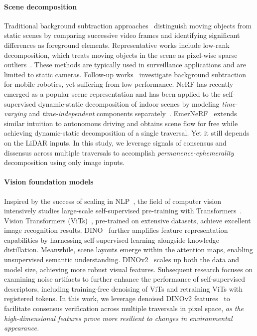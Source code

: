 \paragraph{Scene decomposition} Traditional background subtraction approaches~\cite{piccardi2004background,brutzer2011evaluation} distinguish moving objects from static scenes by comparing successive video frames and identifying significant differences as foreground elements. Representative works include low-rank decomposition, which treats moving objects in the scene as pixel-wise sparse outliers~\cite{zhou2012moving,liu2015background}. These methods are typically used in surveillance applications and are limited to static cameras. Follow-up works~\cite{hayman2003statistical,sheikh2009background} investigate background subtraction for mobile robotics, yet suffering from low performance. NeRF has recently emerged as a popular scene representation and has been applied to the self-supervised dynamic-static decomposition of indoor scenes by modeling \textit{time-varying} and \textit{time-independent} components separately~\cite{yuan2021star,wu2022d}. EmerNeRF~\cite{yang2023emernerf} extends similar intuition to autonomous driving and obtains scene flow for free while achieving dynamic-static decomposition of a single traversal. Yet it still depends on the LiDAR inputs. In this study, we leverage signals of consensus and dissensus across multiple traversals to accomplish \textit{permanence-ephemerality} decomposition using only image inputs.

\paragraph{Vision foundation models} Inspired by the success
of scaling in NLP~\cite{brown2020language}, the field of computer vision intensively studies large-scale self-supervised pre-training with Transformers~\cite{vaswani2017attention}. Vision Transformers (ViTs)~\cite{dosovitskiy2020image}, pre-trained on extensive datasets, achieve excellent image recognition results. DINO~\cite{caron2021emerging} further amplifies feature representation capabilities by harnessing self-supervised learning alongside knowledge distillation. Meanwhile, scene layouts emerge within the attention maps, enabling unsupervised semantic understanding. DINOv2~\cite{oquab2023dinov2} scales up both the data and model size, achieving more robust visual features. Subsequent research focuses on examining noise artifacts to further enhance the performance of self-supervised descriptors, including training-free denoising of ViTs\cite{yang2024denoising} and retraining ViTs with registered tokens\cite{darcet2023vision}. In this work, we leverage denoised DINOv2 features~\cite{oquab2023dinov2,yang2024denoising} to facilitate consensus verification across multiple traversals in pixel space, \textit{as the high-dimensional features prove more resilient to changes in environmental appearance.}



